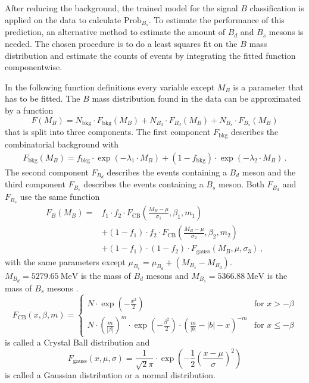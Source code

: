 After reducing the background, the trained model for the signal $B$ classification is applied on the data to calculate $\text{Prob}_{B_s}$.
To estimate the performance of this prediction, an alternative method to estimate the amount of $B_d$ and $B_s$ mesons is needed.
The chosen procedure is to do a least squares fit on the $B$ mass distribution and estimate the counts of events by integrating the fitted function componentwise.


In the following function definitions every variable except $M_B$ is a parameter that has to be fitted.
The $B$ mass distribution found in the data can be approximated by a function
\begin{equation*}
    F(M_B) = N_\text{bkg} \cdot F_\text{bkg}(M_B) + N_{B_d} \cdot F_{B_d}(M_B) + N_{B_s} \cdot F_{B_s}(M_B)
\end{equation*}
that is split into three components.
The first component $F_\text{bkg}$ describes the combinatorial background with 
\begin{align*}
    F_\text{bkg}(M_B) = f_\text{bkg} \cdot \exp(-\lambda_1 \cdot M_B) + (1-f_\text{bkg}) \cdot \exp(-\lambda_2 \cdot M_B) \, .
\end{align*}
The second component $F_{B_d}$ describes the events containing a $B_d$ meson and the third component $F_{B_s}$ describes the events containing a $B_s$ meson.
Both $F_{B_d}$ and $F_{B_s}$ use the same function
\begin{align*}
    F_B(M_B) = &f_1 \cdot f_2 \cdot F_\text{CB}\left(\frac{M_B-\mu}{\sigma_1}, \beta_1, m_1\right) \\
                    &+ (1-f_1) \cdot f_2 \cdot F_\text{CB}\left(\frac{M_B-\mu}{\sigma_2}, \beta_2, m_2\right) \\
                    &+ (1-f_1) \cdot (1-f_2) \cdot F_\text{gauss}\left(M_B,\mu,\sigma_3\right) \, ,
\end{align*}
with the same parameters except $\mu_{B_s} = \mu_{B_d} + (M_{B_s}-M_{B_d})$.
$M_{B_d}=\qty{5279.65}{\MeV}$ is the mass of $B_d$ mesons and $M_{B_s}=\qty{5366.88}{\MeV}$ is the mass of $B_s$ mesons \cite{pdg}.
\begin{equation*}
    F_\text{CB}(x,\beta,m) = 
     \begin{cases}
         N \cdot \exp(-\frac{x^2}{2}) & \text{for } x > -\beta \\
         N \cdot \left(\frac{m}{|\beta|}\right)^m \cdot \exp\left(-\frac{\beta^2}{2}\right) \cdot \left(\frac{m}{|b|}-|b| - x\right)^{-m} & \text{for } x \leq -\beta
     \end{cases}
\end{equation*}
is called a Crystal Ball distribution and
\begin{equation*}
    F_\text{gauss}\left(x,\mu,\sigma\right) = \frac{1}{\sqrt{2}\pi} \cdot \exp\left(-\frac{1}{2}\left(\frac{x-\mu}{\sigma}\right)^2\right)
\end{equation*}
is called a Gaussian distribution or a normal distribution.

